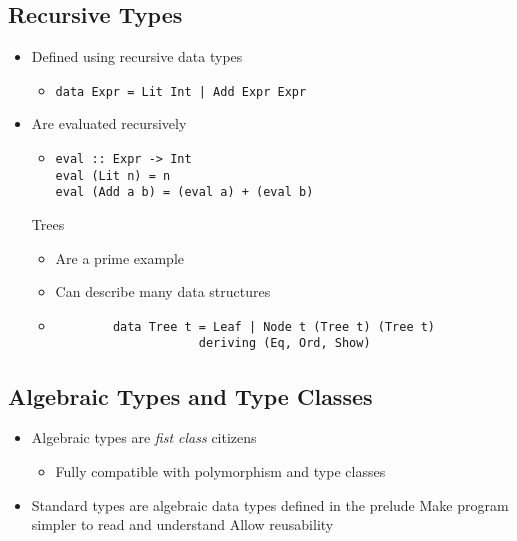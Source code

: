 \subsection{Recursive Types}
\begin{itemize}
    \item Defined using recursive data types
        \begin{itemize}
            \item \verb+data Expr = Lit Int | Add Expr Expr+
        \end{itemize}
    \item Are evaluated recursively
        \begin{itemize}
            \item
\begin{verbatim}
eval :: Expr -> Int
eval (Lit n) = n
eval (Add a b) = (eval a) + (eval b)
\end{verbatim}
        \end{itemize}
     Trees
        \begin{itemize}
            \item Are a prime example
            \item Can describe many data structures
            \item
        \begin{verbatim}
        data Tree t = Leaf | Node t (Tree t) (Tree t)
                    deriving (Eq, Ord, Show)
        \end{verbatim}
        \end{itemize}
\end{itemize}

\subsection{Algebraic Types and Type Classes}
\begin{itemize}
    \item Algebraic types are \textit{fist class} citizens
        \begin{itemize}
            \item Fully compatible with polymorphism and type classes
        \end{itemize}
    \item Standard types are algebraic data types defined in the prelude
    \ipro Make program simpler to read and understand
    \ipro Allow reusability
\end{itemize}

